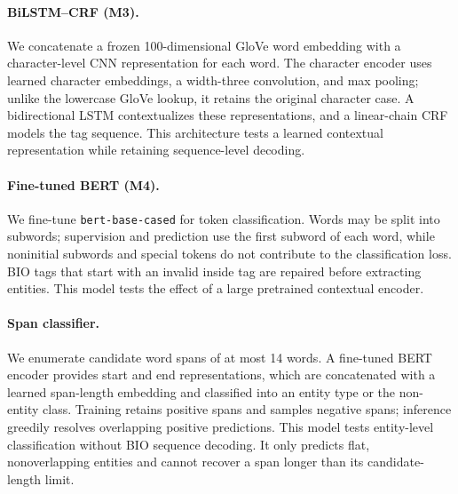 \paragraph{BiLSTM--CRF (M3).}
We concatenate a frozen 100-dimensional GloVe word embedding with a
character-level CNN representation for each word. The character encoder uses
learned character embeddings, a width-three convolution, and max pooling;
unlike the lowercase GloVe lookup, it retains the original character case.
A bidirectional LSTM contextualizes these representations, and a linear-chain
CRF models the tag sequence. This architecture tests a learned contextual
representation while retaining sequence-level decoding.

\paragraph{Fine-tuned BERT (M4).}
We fine-tune \texttt{bert-base-cased} for token classification. Words may be
split into subwords; supervision and prediction use the first subword of each
word, while noninitial subwords and special tokens do not contribute to the
classification loss. BIO tags that start with an invalid inside tag are
repaired before extracting entities. This model tests the effect of a large
pretrained contextual encoder.

\paragraph{Span classifier.}
We enumerate candidate word spans of at most 14 words. A fine-tuned BERT
encoder provides start and end representations, which are concatenated with a
learned span-length embedding and classified into an entity type or the
non-entity class. Training retains positive spans and samples negative spans;
inference greedily resolves overlapping positive predictions. This model tests
entity-level classification without BIO sequence decoding. It only predicts
flat, nonoverlapping entities and cannot recover a span longer than its
candidate-length limit.

